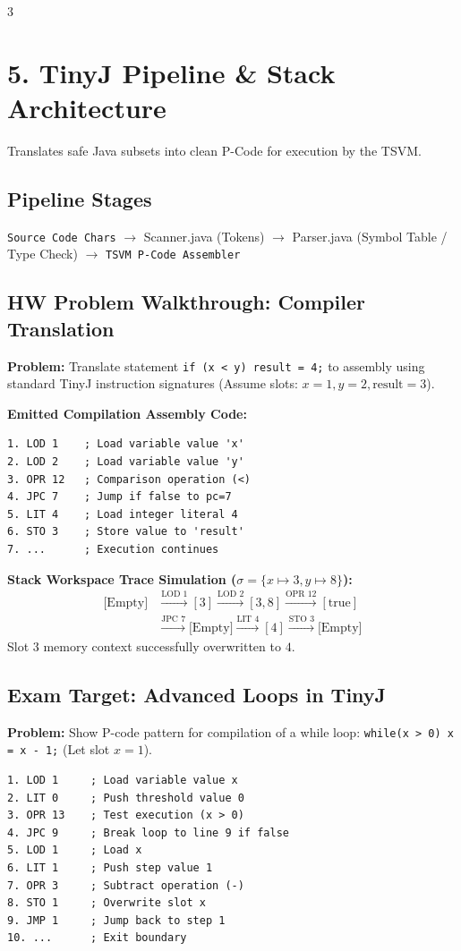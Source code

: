 \documentclass[8.5pt,landscape,a4paper]{article}
\begin{document}
\begin{multicols*}{3}
\section{5. TinyJ Pipeline \& Stack Architecture}
Translates safe Java subsets into clean P-Code for execution by the TSVM.

\subsection{Pipeline Stages}
\texttt{Source Code Chars} $\rightarrow$ \textsf{Scanner.java (Tokens)} $\rightarrow$ \textsf{Parser.java (Symbol Table / Type Check)} $\rightarrow$ \texttt{TSVM P-Code Assembler}

\subsection{HW Problem Walkthrough: Compiler Translation}
\textbf{Problem:} Translate statement \texttt{if (x < y) result = 4;} to assembly using standard TinyJ instruction signatures (Assume slots: $x=1, y=2, \text{result}=3$).

\textbf{Emitted Compilation Assembly Code:}
\begin{verbatim}
1. LOD 1    ; Load variable value 'x'
2. LOD 2    ; Load variable value 'y'
3. OPR 12   ; Comparison operation (<)
4. JPC 7    ; Jump if false to pc=7
5. LIT 4    ; Load integer literal 4
6. STO 3    ; Store value to 'result'
7. ...      ; Execution continues
\end{verbatim}

\textbf{Stack Workspace Trace Simulation ($\sigma = \{x \mapsto 3, y \mapsto 8\}$):}
\begin{align*}
\text{[Empty]} &\xrightarrow{\text{LOD 1}} [3] \xrightarrow{\text{LOD 2}} [3, 8] \xrightarrow{\text{OPR 12}} [\text{true}] \\
&\xrightarrow{\text{JPC 7}} \text{[Empty]} \xrightarrow{\text{LIT 4}} [4] \xrightarrow{\text{STO 3}} \text{[Empty]}
\end{align*}
Slot 3 memory context successfully overwritten to $4$.

\subsection{Exam Target: Advanced Loops in TinyJ}
\textbf{Problem:} Show P-code pattern for compilation of a while loop: \texttt{while(x > 0) x = x - 1;} (Let slot $x = 1$).
\begin{verbatim}
1. LOD 1     ; Load variable value x
2. LIT 0     ; Push threshold value 0
3. OPR 13    ; Test execution (x > 0)
4. JPC 9     ; Break loop to line 9 if false
5. LOD 1     ; Load x
6. LIT 1     ; Push step value 1
7. OPR 3     ; Subtract operation (-)
8. STO 1     ; Overwrite slot x
9. JMP 1     ; Jump back to step 1
10. ...      ; Exit boundary
\end{verbatim}


\end{multicols*}
\end{document}
